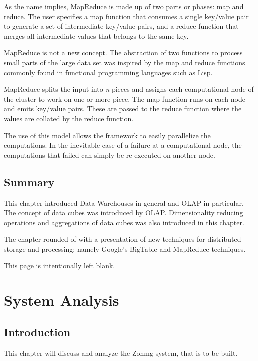 As the name implies, MapReduce is made up of two parts or phases: map and
reduce. The user specifies a map function that consumes a single key/value pair
to generate a set of intermediate key/value pairs, and a reduce function that
merges all intermediate values that belongs to the same key.


MapReduce is not a new concept. The abstraction of two functions to process
small parts of the large data set was inspired by the map and reduce functions
commonly found in functional programming languages such as Lisp.

MapReduce splits the input into \textit{n} pieces and assigns each computational
node of the cluster to work on one or more piece. The map function runs on each
node and emits key/value pairs. These are passed to the reduce function where
the values are collated by the reduce function.

The use of this model allows the framework to easily parallelize the
computations. In the inevitable case of a failure at a computational node, the
computations that failed can simply be re-executed on another node.

\section*{Summary}

This chapter introduced Data Warehouses in general and OLAP in particular. The
concept of data cubes was introduced by OLAP. Dimensionality reducing operations
and aggregations of data cubes was also introduced in this chapter.

The chapter rounded of with a presentation of new techniques for distributed
storage and processing; namely Google's BigTable and MapReduce techniques.


\pagebreak
This page is intentionally left blank.
\pagebreak

\chapter{System Analysis}



\section*{Introduction}

This chapter will discuss and analyze the Zohmg system, that is to be built.

